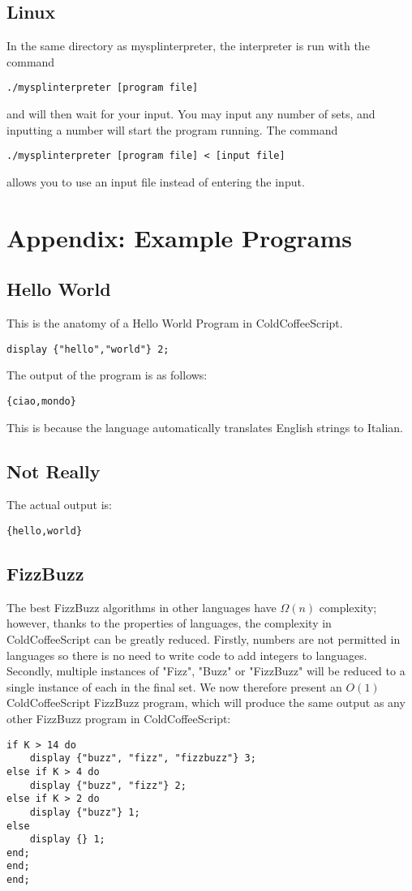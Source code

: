 \documentclass{article}
\begin{document}
\subsection{Linux}
In the same directory as mysplinterpreter, the interpreter is run with the command
\begin{lstlisting}
./mysplinterpreter [program file]
\end{lstlisting}
and will then wait for your input. You may input any number of sets, and inputting a number will start the program running. The command
\begin{lstlisting}
./mysplinterpreter [program file] < [input file]
\end{lstlisting}
allows you to use an input file instead of entering the input.
\newpage
\section{Appendix: Example Programs}
\subsection{Hello World}
This is the anatomy of a Hello World Program in ColdCoffeeScript.
\begin{lstlisting}
display {"hello","world"} 2;
\end{lstlisting}

The output of the program is as follows:
\begin{lstlisting}
{ciao,mondo}
\end{lstlisting}
This is because the language automatically translates English strings to Italian.
\newpage
\subsection{Not Really}
The actual output is:
\begin{lstlisting}
{hello,world}
\end{lstlisting}
\subsection{FizzBuzz}
The best FizzBuzz algorithms in other languages have \(\Omega (n)\) complexity; however, thanks to the properties of languages, the complexity in ColdCoffeeScript can be greatly reduced. Firstly, numbers are not permitted in languages so there is no need to write code to add integers to languages. Secondly, multiple instances of "Fizz", "Buzz" or "FizzBuzz" will be reduced to a single instance of each in the final set. We now therefore present an \(O(1)\) ColdCoffeeScript FizzBuzz program, which will produce the same output as any other FizzBuzz program in ColdCoffeeScript:
\begin{lstlisting}
if K > 14 do
    display {"buzz", "fizz", "fizzbuzz"} 3;
else if K > 4 do
    display {"buzz", "fizz"} 2;
else if K > 2 do
    display {"buzz"} 1;
else
    display {} 1;
end;
end;
end;
\end{lstlisting}
\end{document}
